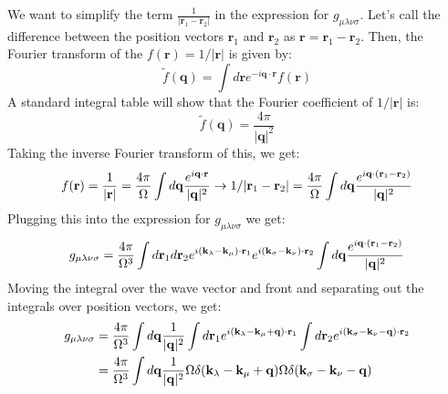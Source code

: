 \documentclass[12pt]{article}
\begin{document}
We want to simplify the term $\frac{1}{|\mathbf{r}_1 - \mathbf{r}_2|}$ in the expression for $g_{\mu\lambda\nu\sigma}$.
Let's call the difference between the position vectors $\mathbf{r}_1$ and $\mathbf{r}_2$ as $\mathbf{r} = \mathbf{r}_1 - \mathbf{r}_2$. Then, the Fourier transform of the $f(\mathbf{r}) = 1/|\mathbf{r}|$ is given by:
\begin{equation}
    \tilde{f}(\mathbf{q})
= \int d\mathbf{r} e^{-i \mathbf{q}\cdot\mathbf{r}} f(\mathbf{r})
\end{equation}
A standard integral table will show that the Fourier coefficient of $1/|\mathbf{r}|$ is:
\begin{equation}
    \tilde{f}(\mathbf{q}) = \frac{4\pi}{|\mathbf{q}|^2}
\end{equation}
Taking the inverse Fourier transform of this, we get:
\begin{equation}
    f(\mathbf{r}) = \frac{1}{|\mathbf{r}|} = \frac{4\pi}{\Omega } \int d\mathbf{q} \frac{e^{i\mathbf{q}\cdot\mathbf{r}}}{|\mathbf{q}|^2} \rightarrow  1/|\mathbf{r}_1 - \mathbf{r}_2| = \frac{4\pi}{\Omega } \int d\mathbf{q} \frac{e^{i\mathbf{q}\cdot\left(\mathbf{r}_1 - \mathbf{r}_2\right)}}{|\vb{q}|^2}
\end{equation}
Plugging this into the expression for $g_{\mu\lambda\nu\sigma}$ we get:
\begin{equation}
\begin{aligned}
    g_{\mu\lambda\nu\sigma} &= \frac{4\pi}{\Omega ^{3}} \int d\mathbf{r}_1 d\mathbf{r}_2 e^{i(\mathbf{k}_\lambda - \mathbf{k}_\mu)\cdot\mathbf{r}_1} e^{i(\mathbf{k}_\sigma - \mathbf{k}_\nu)\cdot\mathbf{r}_2} \int d\mathbf{q} \frac{e^{i\mathbf{q}\cdot\left(\mathbf{r}_1 - \mathbf{r}_2\right)}}{|\vb{q}|^2} \\
\end{aligned}
\end{equation}
Moving the integral over the wave vector and front and separating out the integrals over position vectors, we get:
\begin{equation}
\begin{aligned}
    g_{\mu\lambda\nu\sigma} &= \frac{4\pi}{\Omega ^{3}} \int d\mathbf{q} \frac{1}{|\vb{q}|^2} \int d\mathbf{r}_1 e^{i(\mathbf{k}_\lambda - \mathbf{k}_\mu + \mathbf{q})\cdot\mathbf{r}_1} \int d\mathbf{r}_2 e^{i(\mathbf{k}_\sigma - \mathbf{k}_\nu - \mathbf{q})\cdot\mathbf{r}_2} \\
    &= \frac{4\pi}{\Omega ^{3}} \int d\mathbf{q} \frac{1}{|\vb{q}|^2} \Omega  \delta(\mathbf{k}_\lambda - \mathbf{k}_\mu + \mathbf{q}) \Omega  \delta(\mathbf{k}_\sigma - \mathbf{k}_\nu - \mathbf{q}) \\
\end{aligned}
\end{equation}
\end{document}
